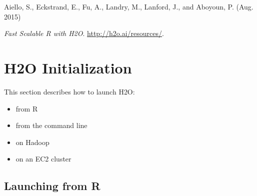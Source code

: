 Aiello, S., Eckstrand, E., Fu, A., Landry, M., Lanford, J., and Aboyoun, P. (Aug. 2015) {\textit{Fast Scalable R with H2O}. {\url{http://h2o.ai/resources/}}. 




\newpage
\section{H2O Initialization}

This section describes how to launch H2O: 
\begin{itemize}
\item from R
\item from the command line
\item on Hadoop
\item on an EC2 cluster
\end{itemize}

\subsection{Launching from R} \label{ssec:LaunchR}

}
